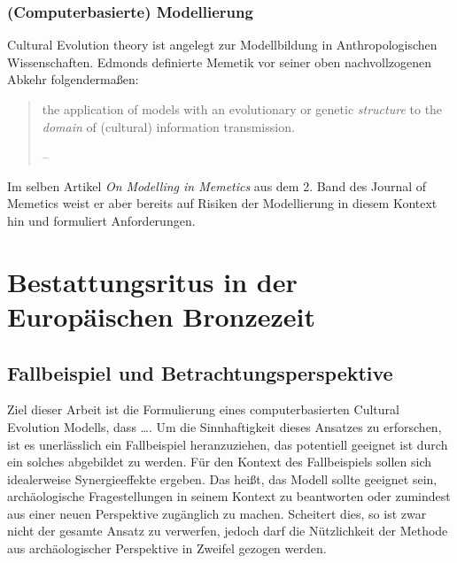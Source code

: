 \documentclass[openany,twoside,twocolumn]{book}
\let\pby\printbibliography
\renewcommand{\printbibliography}{}
\begin{document}
\hypertarget{computerbasierte-modellierung}{%
\subsection{(Computerbasierte)
Modellierung}\label{computerbasierte-modellierung}}

Cultural Evolution theory ist angelegt zur Modellbildung in
Anthropologischen Wissenschaften. Edmonds definierte Memetik vor seiner
oben nachvollzogenen Abkehr folgendermaßen:

\begin{quote}
the application of models with an evolutionary or genetic
\emph{structure} to the \emph{domain} of (cultural) information
transmission.

-- \textcite{edmonds_modelling_1998}
\end{quote}

Im selben Artikel \emph{On Modelling in Memetics} aus dem 2. Band des
Journal of Memetics weist er aber bereits auf Risiken der Modellierung
in diesem Kontext hin und formuliert Anforderungen.

\pby[title={Literatur},segment=\therefsegment,heading=subbibintoc]

\hypertarget{bronze-age-burial-rites}{%
\chapter{Bestattungsritus in der Europäischen
Bronzezeit}\label{bronze-age-burial-rites}}

\hypertarget{fallbeispiel-und-betrachtungsperspektive}{%
\section{Fallbeispiel und
Betrachtungsperspektive}\label{fallbeispiel-und-betrachtungsperspektive}}

Ziel dieser Arbeit ist die Formulierung eines computerbasierten Cultural
Evolution Modells, dass \ldots{}. Um die Sinnhaftigkeit dieses Ansatzes
zu erforschen, ist es unerlässlich ein Fallbeispiel heranzuziehen, das
potentiell geeignet ist durch ein solches abgebildet zu werden. Für den
Kontext des Fallbeispiels sollen sich idealerweise Synergieeffekte
ergeben. Das heißt, das Modell sollte geeignet sein, archäologische
Fragestellungen in seinem Kontext zu beantworten oder zumindest aus
einer neuen Perspektive zugänglich zu machen. Scheitert dies, so ist
zwar nicht der gesamte Ansatz zu verwerfen, jedoch darf die Nützlichkeit
der Methode aus archäologischer Perspektive in Zweifel gezogen werden.
\end{document}

